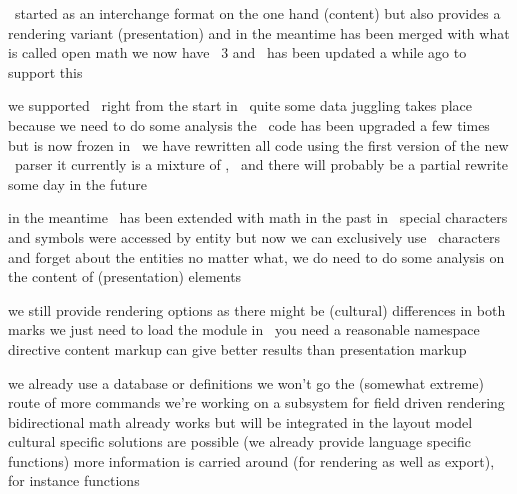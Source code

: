 
\startdocument
  [title=MathML,
   subtitle=or math in general,
   location=\ConTeXt\ Meeting 2011]


\StartSteps
\startitemize
\startitem \MATHML\ started as an interchange format on the one hand (content) \stopitem \FlushStep
\startitem but also provides a rendering variant (presentation) \stopitem \FlushStep
\startitem and in the meantime has been merged with what is called open math \stopitem \FlushStep
\startitem we now have \MATHML\ 3 and \CONTEXT\ has been updated a while ago to support this \stopitem \FlushStep
\stopitemize
\StopSteps


\StartSteps
\startitemize
\startitem we supported \MATHML\ right from the start \stopitem \FlushStep
\startitem in \MKII\ quite some data juggling takes place because we need to do some analysis \stopitem \FlushStep
\startitem the \MKII\ code has been upgraded a few times but is now frozen \stopitem \FlushStep
\startitem in \MKIV\ we have rewritten all code using the first version of the new \XML\ parser \stopitem \FlushStep
\startitem it currently is a mixture of \LUA, \TEX\ and \METAPOST \stopitem \FlushStep
\startitem there will probably be a partial rewrite some day in the future \stopitem \FlushStep
\stopitemize
\StopSteps

\Topic{\UNICODE}

\StartSteps
\startitemize
\startitem in the meantime \UNICODE\ has been extended with math  \stopitem \FlushStep
\startitem in the past in \MATHML\ special characters and symbols were accessed by entity \stopitem \FlushStep
\startitem but now we can exclusively use \UNICODE\ characters and forget about the entities \stopitem \FlushStep
\startitem no matter what, we do need to do some analysis on the content of (presentation) elements \stopitem \FlushStep
\stopitemize
\StopSteps


\StartSteps
\startitemize
\startitem we still provide rendering options as there might be (cultural) differences \stopitem \FlushStep
\startitem in both marks we just need to load the module \stopitem \FlushStep
\startitem in \MKIV\ you need a reasonable namespace directive \stopitem \FlushStep
\startitem content markup can give better results than presentation markup \stopitem \FlushStep
\stopitemize
\StopSteps


\StartSteps
\startitemize
\startitem we already use a database or definitions \stopitem \FlushStep
\startitem we won't go the (somewhat extreme) route of more commands \stopitem \FlushStep
\startitem we're working on a subsystem for field driven rendering \stopitem \FlushStep
\startitem bidirectional math already works but will be integrated in the layout model \stopitem \FlushStep
\startitem cultural specific solutions are possible (we already provide language specific functions) \stopitem \FlushStep
\startitem more information is carried around (for rendering as well as export), for instance functions \stopitem \FlushStep
\stopitemize
\StopSteps

\stopdocument

